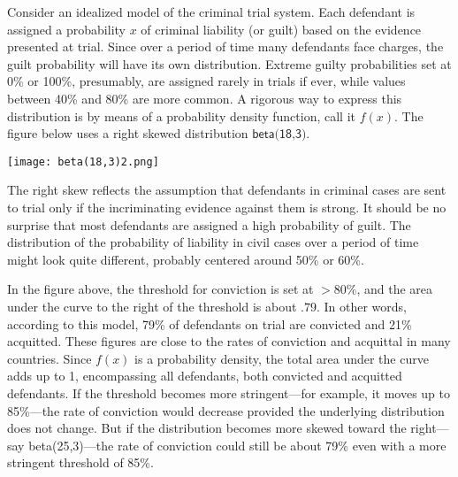\documentclass{article}
\begin{document}
Consider an idealized model of the criminal trial system.  Each defendant is assigned a probability $x$ of criminal liability (or guilt) based on the evidence presented at trial. 
Since over a period of time many defendants face charges, the guilt probability will have its own distribution.  Extreme guilty probabilities set at 0\% or 100\%, presumably,  are assigned rarely in trials if ever, while values between 40\% and 80\% are more common.  
A rigorous way to express this distribution is by means of a probability density function, call it  $f(x)$.  
The figure below uses a right skewed
 distribution $\textsf{beta(18,3)}$. 




\begin{center}
    \texttt{[image: beta(18,3)2.png]}
\end{center}
 
 \noindent
 The right skew reflects the assumption that defendants in criminal cases are sent to trial only if the incriminating evidence against them is strong. It should be no surprise that most defendants are assigned a high probability of guilt. The distribution of the probability of liability in civil cases over a period of time might look quite different, probably centered around 50\% or 60\%.
 

In the figure above, the threshold for conviction is set at $>80\%$, and the area under the curve to the right of the threshold is about $.79$. 
In other words, according to this model, 79\% of defendants on trial are convicted and 21\% acquitted. These figures are close to the rates of conviction and acquittal in many countries. 
Since $f(x)$ is a probability density, the total area under the curve adds up to 1, encompassing all defendants, both convicted and acquitted defendants. 
%
If the threshold becomes more stringent---for example, it moves up to 85\%---the rate of conviction would decrease provided the underlying distribution does not change. But if the distribution becomes more skewed toward the right---say \textsf{beta(25,3)}---the rate of conviction could still be about 79\% even with a more stringent threshold of 85\%. 
\end{document}
